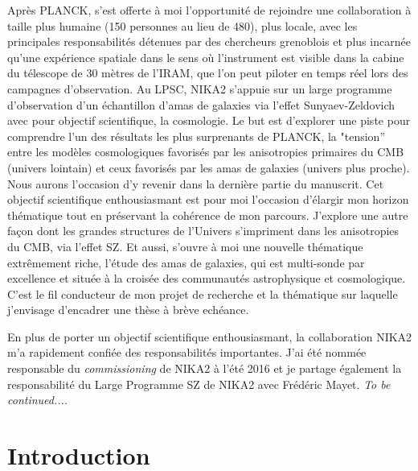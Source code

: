 \documentclass[a4paper, 12pt]{report}
\begin{document}
Après PLANCK, s'est offerte à moi l'opportunité de rejoindre une
collaboration à taille plus humaine (150 personnes au lieu de 480),
plus locale, avec les principales responsabilités détenues par des
chercheurs grenoblois et plus incarnée qu'une expérience spatiale dans
le sens où l'instrument est visible dans la cabine du télescope de 30
mètres de l'IRAM, que l'on peut piloter en temps réel lors des
campagnes d'observation. Au LPSC, NIKA2 s'appuie sur un large
programme d'observation d'un échantillon d'amas de galaxies via
l'effet Sunyaev-Zeldovich avec pour objectif scientifique, la
cosmologie. Le but est d'explorer une piste pour comprendre l'un des
résultats les plus surprenants de PLANCK, la "tension'' entre les
modèles cosmologiques favorisés par les anisotropies primaires du CMB
(univers lointain) et ceux favorisés par les amas de galaxies (univers
plus proche). Nous aurons l'occasion d'y revenir dans la dernière
partie du manuscrit. Cet objectif scientifique enthousiasmant est pour
moi l'occasion d'élargir mon horizon thématique tout en préservant la
cohérence de mon parcours. J'explore une autre façon dont
les grandes structures de l'Univers s'impriment dans les anisotropies
du CMB, via l'effet SZ. Et aussi, s'ouvre à moi une nouvelle
thématique extrêmement riche, l'étude des amas de galaxies, qui est
multi-sonde par excellence et située à la croisée des communautés
astrophysique et cosmologique. C'est le fil conducteur de mon projet
de recherche et la thématique sur laquelle j'envisage d'encadrer une
thèse à brève echéance.

En plus de porter un objectif scientifique enthousiasmant, la
collaboration NIKA2 m'a rapidement confiée des responsabilités
importantes. J'ai été nommée responsable du \emph{commissioning} de
NIKA2 à l'été 2016 et je partage également la responsabilité du Large
Programme SZ de NIKA2 avec Frédéric Mayet. \emph{To be continued....}  




\chapter*{Introduction}




%
%
%
%
%
%
%
%
\end{document}
